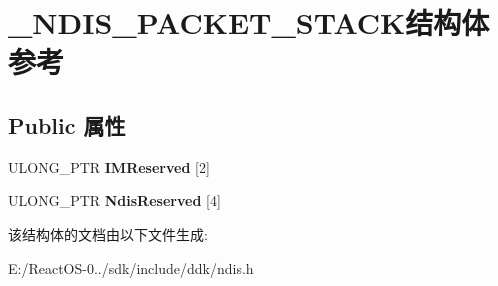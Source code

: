 \hypertarget{struct___n_d_i_s___p_a_c_k_e_t___s_t_a_c_k}{}\section{\+\_\+\+N\+D\+I\+S\+\_\+\+P\+A\+C\+K\+E\+T\+\_\+\+S\+T\+A\+C\+K结构体 参考}
\label{struct___n_d_i_s___p_a_c_k_e_t___s_t_a_c_k}
\subsection*{Public 属性}
\begin{DoxyCompactItemize}
\item 
\mbox{\label{struct___n_d_i_s___p_a_c_k_e_t___s_t_a_c_k_ae7f42e948ed0f11c0be1f9b930452f36}} 
U\+L\+O\+N\+G\+\_\+\+P\+TR {\bfseries I\+M\+Reserved} \mbox{[}2\mbox{]}
\item 
\mbox{\label{struct___n_d_i_s___p_a_c_k_e_t___s_t_a_c_k_ab5602038a41861d78b0032ddcac517dc}} 
U\+L\+O\+N\+G\+\_\+\+P\+TR {\bfseries Ndis\+Reserved} \mbox{[}4\mbox{]}
\end{DoxyCompactItemize}


该结构体的文档由以下文件生成\+:\begin{DoxyCompactItemize}
\item 
E\+:/\+React\+O\+S-\/0../sdk/include/ddk/ndis.\+h\end{DoxyCompactItemize}
